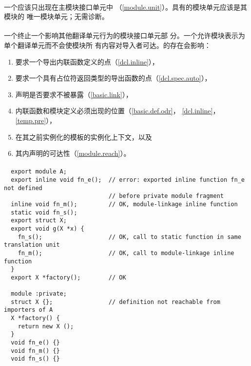 
\paragraph{} %
一个应该只出现在主模块接口单元中
（\ref{module.unit}）。具有的模块单元应该是其模块的
唯一模块单元；无需诊断。

\paragraph{} %
\begin{note}
  一个终止一个影响其他翻译单元行为的模块接口单元部
  分。一个允许模块表示为单个翻译单元而不会使模块所
  有内容对导入者可达。的存在会影响：
  \begin{enumerate}
    \item 要求一个导出内联函数定义的点（\ref{dcl.inline}），
    \item 要求一个具有占位符返回类型的导出函数的点（\ref{dcl.spec.auto}），
    \item 声明是否要求不被暴露（\ref{basic.link}），
    \item 内联函数和模块定义必须出现的位置（\ref{basic.def.odr}，
      \ref{dcl.inline}，\ref{temp.pre}），
    \item 在其之前实例化的模板的实例化上下文，以及
    \item 其内声明的可达性（\ref{module.reach}）。
  \end{enumerate}
\end{note}

\paragraph{} %
\begin{example}
  \begin{lstlisting}
  export module A;
  export inline void fn_e();  // error: exported inline function fn_e not defined
                              // before private module fragment
  inline void fn_m();         // OK, module-linkage inline function
  static void fn_s();
  export struct X;
  export void g(X *x) {
    fn_s();                   // OK, call to static function in same translation unit
    fn_m();                   // OK, call to module-linkage inline function
  }
  export X *factory();        // OK

  module :private;
  struct X {};                // definition not reachable from importers of A
  X *factory() {
    return new X ();
  }
  void fn_e() {}
  void fn_m() {}
  void fn_s() {}
  \end{lstlisting}
\end{example}
